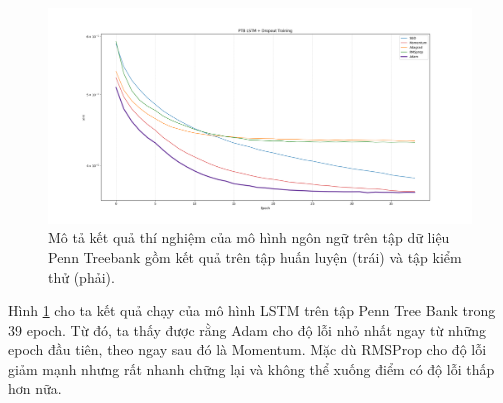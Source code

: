 \begin{figure}[htp]
	\centering
	\includegraphics[width=140 mm]{images/ptb.png}
	\caption{Mô tả kết quả thí nghiệm của mô hình ngôn ngữ trên tập dữ liệu Penn Treebank gồm kết quả trên tập huấn luyện (trái) và tập kiểm thử (phải).}
	\label{fig:ptb}
\end{figure}

Hình \ref{fig:ptb} cho ta kết quả chạy của mô hình LSTM trên tập Penn Tree Bank trong 39 epoch. Từ đó, ta thấy được rằng Adam cho độ lỗi nhỏ nhất ngay từ những epoch đầu tiên, theo ngay sau đó là Momentum. Mặc dù RMSProp cho độ lỗi giảm mạnh nhưng rất nhanh chững lại và không thể xuống điểm có độ lỗi thấp hơn nữa.
